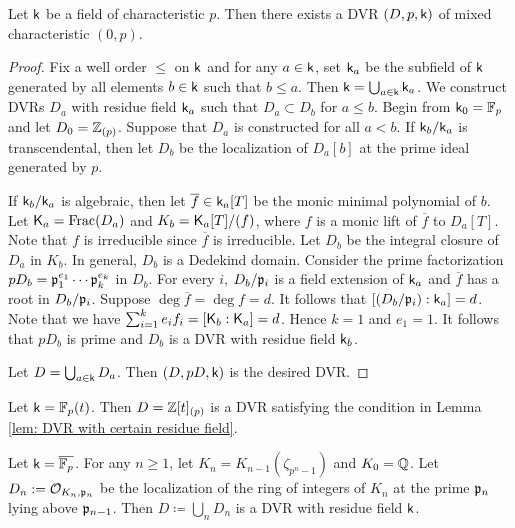         \begin{lemma}\label{lem: DVR with certain residue field}
            Let \({\mathsf{k}}\) be a field of characteristic \(p\).
            Then there exists a DVR \((D,p,{\mathsf{k}})\) of mixed characteristic \((0,p)\).
        \end{lemma}
        \begin{proof}
            Fix a well order \(\leq\) on \({\mathsf{k}}\) and for any \(a \in {\mathsf{k}}\), set \({\mathsf{k}}_a\) be the subfield of \({\mathsf{k}}\) generated by all elements \(b \in {\mathsf{k}}\) such that \(b \leq a\).
            Then \({\mathsf{k}} = \bigcup_{a \in {\mathsf{k}}} {\mathsf{k}}_a\).
            We construct DVRs \(D_a\) with residue field \({\mathsf{k}}_a\) such that \(D_a \subset D_b\) for \(a \leq b\).
            Begin from \({\mathsf{k}}_0 = {\mathbb{F}}_p\) and let \(D_0 = {\mathbb{Z}}_{(p)}\).
            Suppose that \(D_a\) is constructed for all \(a < b\).
            If \({\mathsf{k}}_b/{\mathsf{k}}_a\) is transcendental, then let \(D_b\) be the localization of \(D_a[b]\) at the prime ideal generated by \(p\).
            
            If \({\mathsf{k}}_b/{\mathsf{k}}_a\) is algebraic, then let \(\overline{f} \in {\mathsf{k}}_a[T]\) be the monic minimal polynomial of \(b\).
            Let \({\mathsf{K}}_a = \operatorname{Frac}(D_a)\) and \(K_b = {\mathsf{K}}_a[T]/(f)\), where \(f\) is a monic lift of \(\overline{f}\) to \(D_a[T]\).
            Note that \(f\) is irreducible since \(\overline{f}\) is irreducible.
            Let \(D_b\) be the integral closure of \(D_a\) in \(K_b\).
            In general, \(D_b\) is a Dedekind domain.
            Consider the prime factorization \(pD_b = {\mathfrak{p}}_1^{e_1} \cdots {\mathfrak{p}}_k^{e_k}\) in \(D_b\).
            For every \(i\), \(D_b/{\mathfrak{p}}_i\) is a field extension of \({\mathsf{k}}_a\) and \(\overline{f}\) has a root in \(D_b/{\mathfrak{p}}_i\).
            Suppose \(\deg \overline{f} = \deg f= d\).
            It follows that \([(D_b/{\mathfrak{p}}_i):{\mathsf{k}}_a] = d\).
            Note that we have \(\sum_{i=1}^k e_if_i = [{\mathsf{K}}_b:{\mathsf{K}}_a] = d\).
            Hence \(k = 1\) and \(e_1 = 1\).
            It follows that \(pD_b\) is prime and \(D_b\) is a DVR with residue field \({\mathsf{k}}_b\).
            
            Let \(D = \bigcup_{a \in {\mathsf{k}}} D_a\).
            Then \((D,pD,{\mathsf{k}})\) is the desired DVR.
        \end{proof}

        \begin{example}\label{eg: DVR with certain residue fields}
            Let \({\mathsf{k}} = {\mathbb{F}}_p(t)\).
            Then \(D = {\mathbb{Z}}[t]_{(p)}\) is a DVR satisfying the condition in Lemma \ref{lem: DVR with certain residue field}.

            Let \({\mathsf{k}} = \overline{{\mathbb{F}}_p}\).
            For any \(n \geq 1\), let \(K_n = K_{n-1}(\zeta_{p^n-1})\) and \(K_0 = {\mathbb{Q}}\).
            Let \(D_n := {\mathcal{O}}_{K_n,{\mathfrak{p}}_n}\) be the localization of the ring of integers of \(K_n\) at the prime \({\mathfrak{p}}_n\) lying above \({\mathfrak{p}}_{n-1}\).
            Then \(D\coloneqq \bigcup_n D_n\) is a DVR with residue field \({\mathsf{k}}\).
        \end{example}

